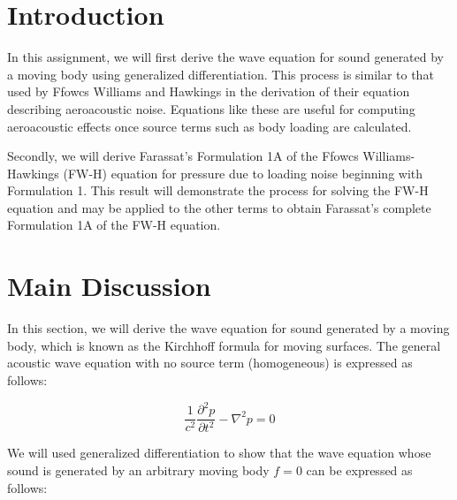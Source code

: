 \documentclass[]{aiaa-tc}%
\begin{document}





\section{Introduction} %

In this assignment, we will first derive the wave equation for sound generated by a moving body using generalized differentiation.  This process is similar to that used by Ffowcs Williams and Hawkings in the derivation of their equation describing aeroacoustic noise.  Equations like these are useful for computing aeroacoustic effects once source terms such as body loading are calculated.

Secondly, we will derive Farassat's Formulation 1A of the Ffowcs Williams-Hawkings (FW-H) equation for pressure due to loading noise beginning with Formulation 1.  This result will demonstrate the process for solving the FW-H equation and may be applied to the other terms to obtain Farassat's complete Formulation 1A of the FW-H equation.





\section{Main Discussion}

In this section, we will derive the wave equation for sound generated by a moving body, which is known as the Kirchhoff formula for moving surfaces.  The general acoustic wave equation with no source term (homogeneous) is expressed as follows:

\begin{equation} \label{AcousticWaveHomo}
\boxed{\dfrac{1}{c^2}\dfrac{\partial^2p}{\partial t^2} - \nabla^2p = 0}
\end{equation}

We will used generalized differentiation to show that the wave equation whose sound is generated by an arbitrary moving body $f=0$ can be expressed as follows:
\end{document}
